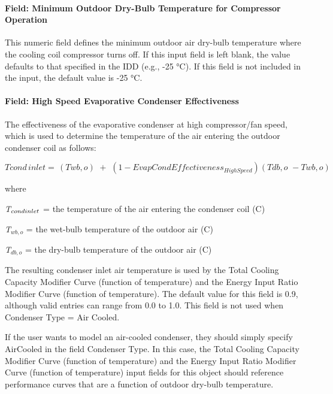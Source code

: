 \paragraph{Field: Minimum Outdoor Dry-Bulb Temperature for Compressor Operation}\label{field-minimum-outdoor-dry-bulb-temperature-for-compressor-operation}

This numeric field defines the minimum outdoor air dry-bulb temperature where the cooling coil compressor turns off. If this input field is left blank, the value defaults to that specified in the IDD (e.g., -25 °C). If this field is not included in the input, the default value is -25 °C.

\paragraph{Field: High Speed Evaporative Condenser Effectiveness}\label{field-high-speed-evaporative-condenser-effectiveness}

The effectiveness of the evaporative condenser at high compressor/fan speed, which is used to determine the temperature of the air entering the outdoor condenser coil as follows:

\begin{equation}
Tcond\,inlet = \,\left( {Twb,o} \right)\,\, + \,\,\left( {1 - EvapCondEffectivenes{s_{HighSpeed}}} \right)\left( {Tdb,o\,\, - Twb,o} \right)
\end{equation}

where

\emph{T\(_{cond\\ inlet}\)} = the temperature of the air entering the condenser coil (C)

\emph{T\(_{wb,o}\)} = the wet-bulb temperature of the outdoor air (C)

\emph{T\(_{db,o}\)} = the dry-bulb temperature of the outdoor air (C)

The resulting condenser inlet air temperature is used by the Total Cooling Capacity Modifier Curve (function of temperature) and the Energy Input Ratio Modifier Curve (function of temperature). The default value for this field is 0.9, although valid entries can range from 0.0 to 1.0. This field is not used when Condenser Type = Air Cooled.

If the user wants to model an air-cooled condenser, they should simply specify AirCooled in the field Condenser Type. In this case, the Total Cooling Capacity Modifier Curve (function of temperature) and the Energy Input Ratio Modifier Curve (function of temperature) input fields for this object should reference performance curves that are a function of outdoor dry-bulb temperature.

